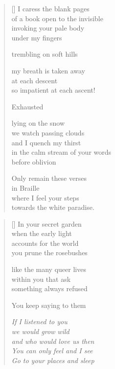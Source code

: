 \documentclass[14pt]{extbook}
\newcommand*{\centeredornament}{\centerline{\pgfornament[width=6cm]{88}}}
\begin{document}
\begin{verse}[\versewidth]
  I caress the blank pages \\
  of a book open to the invisible \\
  invoking your pale body \\
  under my fingers

  trembling on soft hills

  my breath is taken away \\
  at each descent \\
  so impatient at each ascent!

  Exhausted

  lying on the snow \\
  we watch passing clouds \\
  and I quench my thirst \\
  in the calm stream of your words \\
  before oblivion

  Only remain these verses \\
  in Braille \\
  where I feel your steps \\
  towards the white paradise.
\end{verse}


\newpage

\vspace*{-15mm}
\centeredornament
\vspace*{-7mm}


\settowidth{\versewidth}{and who would love us then}

\begin{verse}[\versewidth]
  In your secret garden \\
  when the early light \\
  accounts for the world \\
  you prune the rosebushes

  like the many queer lives \\
  within you that ask \\
  something always refused

  You keep saying to them

  \emph{If I listened to you \\
  we would grow wild \\
  and who would love us then \\
  You can only feel and I see \\
  Go to your places and sleep}
\end{verse}
\end{document}
